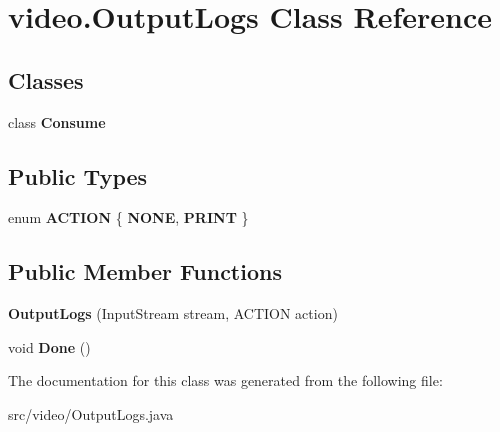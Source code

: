 \hypertarget{classvideo_1_1_output_logs}{
\section{video.OutputLogs Class Reference}
\label{classvideo_1_1_output_logs}
}
\subsection*{Classes}
\begin{DoxyCompactItemize}
\item 
class {\bfseries Consume}
\end{DoxyCompactItemize}
\subsection*{Public Types}
\begin{DoxyCompactItemize}
\item 
enum {\bfseries ACTION} \{ {\bfseries NONE}, 
{\bfseries PRINT}
 \}
\end{DoxyCompactItemize}
\subsection*{Public Member Functions}
\begin{DoxyCompactItemize}
\item 
\hypertarget{classvideo_1_1_output_logs_a8e5012743d6af666430b7c080409d30a}{
{\bfseries OutputLogs} (InputStream stream, ACTION action)}
\label{classvideo_1_1_output_logs_a8e5012743d6af666430b7c080409d30a}

\item 
\hypertarget{classvideo_1_1_output_logs_aaf5d73cc9191241e00d5669c3c038709}{
void {\bfseries Done} ()}
\label{classvideo_1_1_output_logs_aaf5d73cc9191241e00d5669c3c038709}

\end{DoxyCompactItemize}


The documentation for this class was generated from the following file:\begin{DoxyCompactItemize}
\item 
src/video/OutputLogs.java\end{DoxyCompactItemize}
